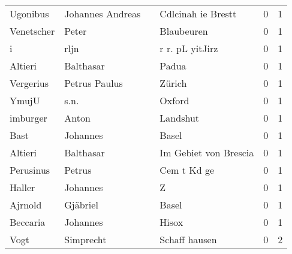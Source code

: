 \begin{center}
\begin{tiny}
\begin{longtabu}{llllrr}
                 Ugonibus &                   Johannes Andreas &             &                          Cdlcinah ie Brestt &          0 &         1 \\
               Venetscher &                              Peter &             &                                  Blaubeuren &          0 &         1 \\
                        i &                               rljn &             &                             r r. pL yitJirz &          0 &         1 \\
                  Altieri &                          Balthasar &             &                                       Padua &          0 &         1 \\
                Vergerius &                      Petrus Paulus &             &                                      Zürich &          0 &         1 \\
                    YmujU &                               s.n. &             &                                      Oxford &          0 &         1 \\
                 imburger &                              Anton &             &                                    Landshut &          0 &         1 \\
                     Bast &                           Johannes &             &                                       Basel &          0 &         1 \\
                  Altieri &                          Balthasar &             &                       Im Gebiet von Brescia &          0 &         1 \\
                Perusinus &                             Petrus &             &                                 Cem t Kd ge &          0 &         1 \\
                   Haller &                           Johannes &             &                                           Z &          0 &         1 \\
                  Ajrnold &                           Gjäbriel &             &                                       Basel &          0 &         1 \\
                 Beccaria &                           Johannes &             &                                       Hisox &          0 &         1 \\
                     Vogt &                          Simprecht &             &                               Schaff hausen &          0 &         2 \\

\end{longtabu}
\end{tiny}
\end{center}
